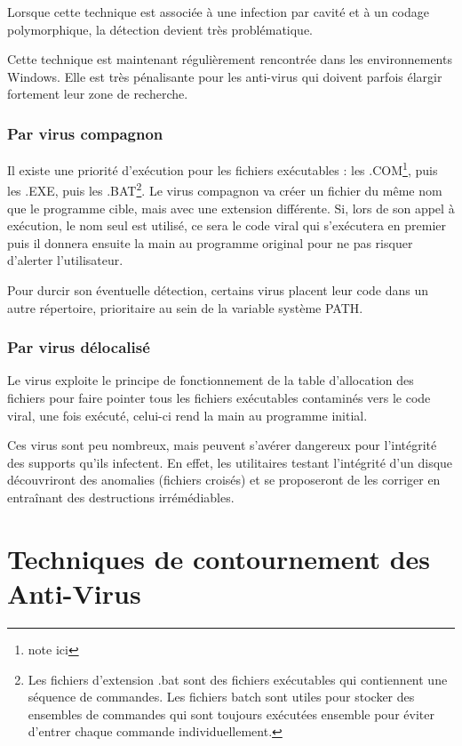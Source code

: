         Lorsque cette technique est associée à une infection par cavité et à un codage polymorphique, 
        la détection devient très problématique.

        Cette technique est maintenant régulièrement rencontrée dans les environnements Windows. 
        Elle est très pénalisante pour les anti-virus qui doivent parfois élargir fortement leur zone de recherche.

        \subsubsection{Par virus compagnon}
        Il existe une priorité d'exécution pour les fichiers exécutables : les .COM\footnote{note ici}, puis les .EXE, 
        puis les .BAT\footnote{Les fichiers d'extension .bat sont des fichiers exécutables qui contiennent une 
        séquence de commandes. Les fichiers batch sont utiles pour stocker des ensembles de commandes qui sont 
        toujours exécutées ensemble pour éviter d’entrer chaque commande individuellement.}.
        Le virus compagnon va créer un fichier du même nom que le programme cible, 
        mais avec une extension différente. Si, lors de son appel à exécution, le nom seul est utilisé, 
        ce sera le code viral qui s’exécutera en premier puis il donnera ensuite la main au programme 
        original pour ne pas risquer d’alerter l’utilisateur.

        Pour durcir son éventuelle détection, certains virus placent leur code dans un autre répertoire, 
        prioritaire au sein de la variable système PATH.

        \subsubsection{Par virus délocalisé}
        Le virus exploite le principe de fonctionnement de la table d'allocation des fichiers pour faire pointer 
        tous les fichiers exécutables contaminés vers le code viral, une fois exécuté, celui-ci rend 
        la main au programme initial.

        Ces virus sont peu nombreux, mais peuvent s’avérer dangereux pour l’intégrité des supports qu’ils infectent. 
        En effet, les utilitaires testant l’intégrité d’un disque découvriront des anomalies (fichiers croisés) 
        et se proposeront de les corriger en entraînant des destructions irrémédiables.

\section{Techniques de contournement des Anti-Virus}

